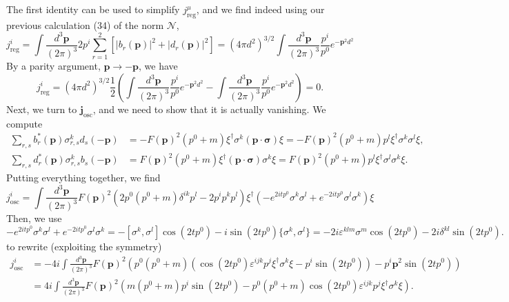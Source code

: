 The first identity can be used to simplify $j^\mu_{\text{reg}}$, and we find indeed using our previous calculation (34) of the norm $\mathcal{N}$,
\begin{equation}
    j^i_{\text{reg}} = \int \frac{d^3\mathbf{p}}{(2\pi)^3} 2p^i \sum_{r=1}^2 \left[ |b_r(\mathbf{p})|^2 + |d_r(\mathbf{p})|^2 \right] = (4\pi d^2)^{3/2} \int \frac{d^3\mathbf{p}}{(2\pi)^3} \frac{p^i}{p^0} e^{-\mathbf{p}^2d^2}
\end{equation}
By a parity argument, $\mathbf{p} \to -\mathbf{p}$, we have
\begin{equation}
    j^i_{\text{reg}} = (4\pi d^2)^{3/2} \frac{1}{2} \left( \int \frac{d^3\mathbf{p}}{(2\pi)^3} \frac{p^i}{p^0} e^{-\mathbf{p}^2d^2} - \int \frac{d^3\mathbf{p}}{(2\pi)^3} \frac{p^i}{p^0} e^{-\mathbf{p}^2d^2} \right) = 0.
\end{equation}
Next, we turn to $\mathbf{j}_{\text{osc}}$, and we need to show that it is actually vanishing. We compute
\begin{equation}
\begin{aligned}
    \sum_{r,s} b_r^*(\mathbf{p})\sigma^k_{r,s}d_s(-\mathbf{p}) &= -F(\mathbf{p})^2(p^0+m)\xi^\dagger\sigma^k(\mathbf{p}\cdot\boldsymbol{\sigma})\xi = -F(\mathbf{p})^2(p^0+m)p^l\xi^\dagger\sigma^k\sigma^l\xi, \\
    \sum_{r,s} d_r^*(\mathbf{p})\sigma^k_{r,s}b_s(-\mathbf{p}) &= F(\mathbf{p})^2(p^0+m)\xi^\dagger(\mathbf{p}\cdot\boldsymbol{\sigma})\sigma^k\xi = F(\mathbf{p})^2(p^0+m)p^l\xi^\dagger\sigma^l\sigma^k\xi.
\end{aligned}
\end{equation}
Putting everything together, we find
\begin{equation}
    j^i_{\text{osc}} = \int \frac{d^3\mathbf{p}}{(2\pi)^3} F(\mathbf{p})^2 \left( 2p^0(p^0+m)\delta^{ik}p^l - 2p^ip^kp^l \right) \xi^\dagger \left( -e^{2itp^0}\sigma^k\sigma^l + e^{-2itp^0}\sigma^l\sigma^k \right) \xi
\end{equation}
Then, we use
\begin{equation}
    -e^{2itp^0}\sigma^k\sigma^l + e^{-2itp^0}\sigma^l\sigma^k = -[\sigma^k, \sigma^l]\cos(2tp^0) - i\sin(2tp^0)\{\sigma^k, \sigma^l\} = -2i\varepsilon^{klm}\sigma^m\cos(2tp^0) - 2i\delta^{kl}\sin(2tp^0).
\end{equation}
to rewrite (exploiting the symmetry)
\begin{equation}
\begin{aligned}
    j^i_{\text{osc}} &= -4i \int \frac{d^3\mathbf{p}}{(2\pi)^3} F(\mathbf{p})^2 \left( p^0(p^0+m)(\cos(2tp^0)\varepsilon^{ijk}p^j\xi^\dagger\sigma^k\xi - p^i\sin(2tp^0)) - p^i\mathbf{p}^2\sin(2tp^0) \right) \\
    &= 4i \int \frac{d^3\mathbf{p}}{(2\pi)^3} F(\mathbf{p})^2 \left( m(p^0+m)p^i\sin(2tp^0) - p^0(p^0+m)\cos(2tp^0)\varepsilon^{ijk}p^j\xi^\dagger\sigma^k\xi \right).
\end{aligned}
\end{equation}
